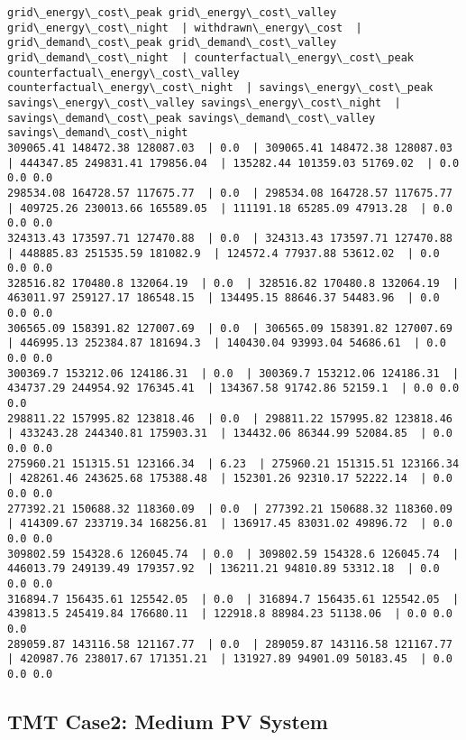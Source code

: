 \documentclass[11pt]{article}
\begin{document}
    \begin{Verbatim}[commandchars=\\\{\}]
grid\_energy\_cost\_peak grid\_energy\_cost\_valley grid\_energy\_cost\_night  | withdrawn\_energy\_cost  | grid\_demand\_cost\_peak grid\_demand\_cost\_valley grid\_demand\_cost\_night  | counterfactual\_energy\_cost\_peak counterfactual\_energy\_cost\_valley counterfactual\_energy\_cost\_night  | savings\_energy\_cost\_peak savings\_energy\_cost\_valley savings\_energy\_cost\_night  | savings\_demand\_cost\_peak savings\_demand\_cost\_valley savings\_demand\_cost\_night 
309065.41 148472.38 128087.03  | 0.0  | 309065.41 148472.38 128087.03  | 444347.85 249831.41 179856.04  | 135282.44 101359.03 51769.02  | 0.0 0.0 0.0 
298534.08 164728.57 117675.77  | 0.0  | 298534.08 164728.57 117675.77  | 409725.26 230013.66 165589.05  | 111191.18 65285.09 47913.28  | 0.0 0.0 0.0 
324313.43 173597.71 127470.88  | 0.0  | 324313.43 173597.71 127470.88  | 448885.83 251535.59 181082.9  | 124572.4 77937.88 53612.02  | 0.0 0.0 0.0 
328516.82 170480.8 132064.19  | 0.0  | 328516.82 170480.8 132064.19  | 463011.97 259127.17 186548.15  | 134495.15 88646.37 54483.96  | 0.0 0.0 0.0 
306565.09 158391.82 127007.69  | 0.0  | 306565.09 158391.82 127007.69  | 446995.13 252384.87 181694.3  | 140430.04 93993.04 54686.61  | 0.0 0.0 0.0 
300369.7 153212.06 124186.31  | 0.0  | 300369.7 153212.06 124186.31  | 434737.29 244954.92 176345.41  | 134367.58 91742.86 52159.1  | 0.0 0.0 0.0 
298811.22 157995.82 123818.46  | 0.0  | 298811.22 157995.82 123818.46  | 433243.28 244340.81 175903.31  | 134432.06 86344.99 52084.85  | 0.0 0.0 0.0 
275960.21 151315.51 123166.34  | 6.23  | 275960.21 151315.51 123166.34  | 428261.46 243625.68 175388.48  | 152301.26 92310.17 52222.14  | 0.0 0.0 0.0 
277392.21 150688.32 118360.09  | 0.0  | 277392.21 150688.32 118360.09  | 414309.67 233719.34 168256.81  | 136917.45 83031.02 49896.72  | 0.0 0.0 0.0 
309802.59 154328.6 126045.74  | 0.0  | 309802.59 154328.6 126045.74  | 446013.79 249139.49 179357.92  | 136211.21 94810.89 53312.18  | 0.0 0.0 0.0 
316894.7 156435.61 125542.05  | 0.0  | 316894.7 156435.61 125542.05  | 439813.5 245419.84 176680.11  | 122918.8 88984.23 51138.06  | 0.0 0.0 0.0 
289059.87 143116.58 121167.77  | 0.0  | 289059.87 143116.58 121167.77  | 420987.76 238017.67 171351.21  | 131927.89 94901.09 50183.45  | 0.0 0.0 0.0 

    \end{Verbatim}

    \hypertarget{tmt-case2-medium-pv-system}{%
\subsection{TMT Case2: Medium PV
System}\label{tmt-case2-medium-pv-system}}
\end{document}
